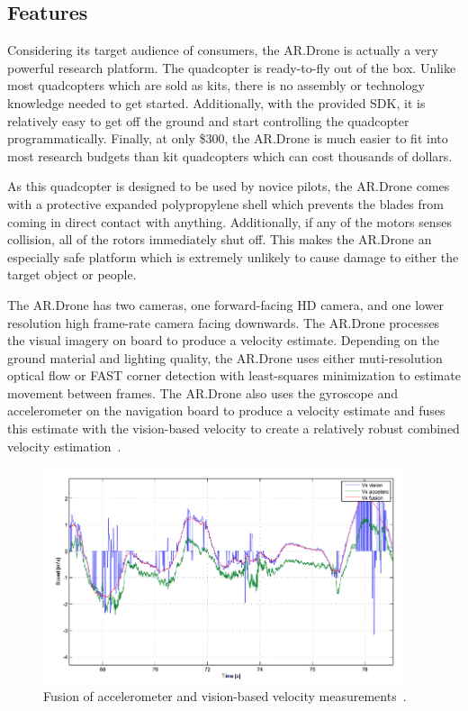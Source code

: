     \subsection{Features}
        Considering its target audience of consumers, the AR.Drone is actually a very powerful research platform. The quadcopter is ready-to-fly out of the box. Unlike most quadcopters which are sold as kits, there is no assembly or technology knowledge needed to get started. Additionally, with the provided SDK, it is relatively easy to get off the ground and start controlling the quadcopter programmatically. Finally, at only \$300, the AR.Drone is much easier to fit into most research budgets than kit quadcopters which can cost thousands of dollars. 

        As this quadcopter is designed to be used by novice pilots, the AR.Drone comes with a protective expanded polypropylene shell which prevents the blades from coming in direct contact with anything. Additionally, if any of the motors senses collision, all of the rotors immediately shut off. This makes the AR.Drone an especially safe platform which is extremely unlikely to cause damage to either the target object or people.

        The AR.Drone has two cameras, one forward-facing HD camera, and one lower resolution high frame-rate camera facing downwards. The AR.Drone processes the visual imagery on board to produce a velocity estimate. Depending on the ground material and lighting quality, the AR.Drone uses either muti-resolution optical flow or FAST corner detection with least-squares minimization to estimate movement between frames. The AR.Drone also uses the gyroscope and accelerometer on the navigation board to produce a velocity estimate and fuses this estimate with the vision-based velocity to create a relatively robust combined velocity estimation~\cite{Bristeau}.

        \begin{figure}[ht]
            \centering
            \includegraphics[width=400px]{../images/fused.png}
            \caption{Fusion of accelerometer and vision-based velocity measurements~\cite{Bristeau}.}\label{fig:fusion}
        \end{figure}

